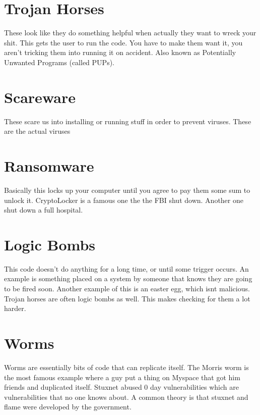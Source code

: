 \documentclass{article}
\begin{document}

\section{Trojan Horses} %
\label{sec:trojan_horses}
These look like they do something helpful when actually they want to wreck your shit. This gets the user to run the code. You have to make them want it, you aren't tricking them into running it on accident. Also known as Potentially Unwanted Programs (called PUPs).


\section{Scareware} %
\label{sec:scareware}
These scare us into installing or running stuff in order to prevent viruses. These are the actual viruses



\section{Ransomware} %
\label{sec:ransomware}
Basically this locks up your computer until you agree to pay them some sum to unlock it. CryptoLocker is a famous one the the FBI shut down. Another one shut down a full hospital.


\section{Logic Bombs} %
\label{sec:logic_bombs}
This code doesn't do anything for a long time, or until some trigger occurs. An example is something placed on a system by someone that knows they are going to be fired soon. Another example of this is an easter egg, which isnt malicious. Trojan horses are often logic bombs as well. This makes checking for them a lot harder. 


\section{Worms} %
\label{sec:worms}
Worms are essentially bits of code that can replicate itself. The Morris worm is the most famous example where a guy put a thing on Myspace that got him friends and duplicated itself. Stuxnet abused 0 day vulnerabilities which are vulnerabilities that no one knows about. A common theory is that stuxnet and flame were developed by the government.
\end{document}
